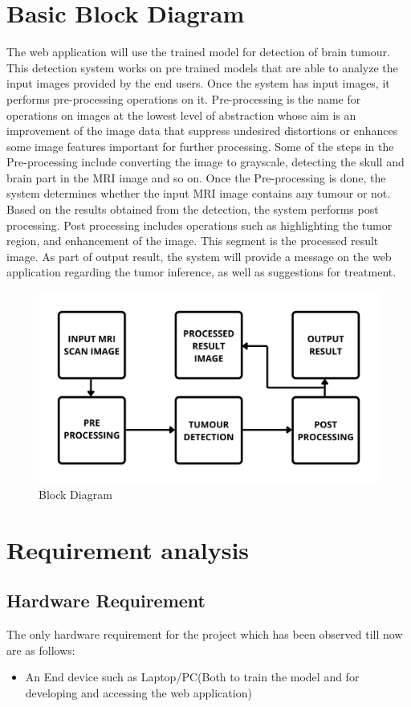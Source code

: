 \section{Basic Block Diagram}
The web application will use the trained model for detection of brain tumour. This detection system works on pre trained models that are able to analyze the input images provided by the end users. Once the system has input images, it performs pre-processing operations on it. Pre-processing is the name for operations on images at the lowest level of abstraction whose aim is an improvement of the image data that suppress undesired distortions or enhances some image features important for further processing. Some of the steps in the Pre-processing include converting the image to grayscale, detecting the skull and brain part in the MRI image and so on. Once the Pre-processing is done, the system determines whether the input MRI image contains any tumour or not. Based on the results obtained from the detection, the system performs post processing. Post processing includes operations such as highlighting the tumor region, and enhancement of the image. This segment is the processed result image. As part of output result, the system will provide a message on the web application regarding the tumor inference, as well as suggestions for treatment.
\begin{figure}[H]
\includegraphics[scale=0.2]{Photos/blockdiagram.png}
\caption{Block Diagram} \label{fig:ishan}
\end{figure}
\section{Requirement analysis}
\subsection{Hardware Requirement}
The only hardware requirement for the project which has been observed till now are as follows:
\begin{itemize}
    \item An End device such as Laptop/PC(Both to train the model and for developing and accessing the web application)
\end{itemize}
